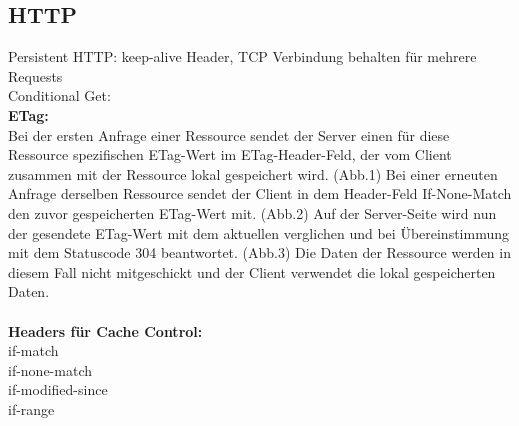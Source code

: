 \subsection{HTTP}
Persistent HTTP: keep-alive Header, TCP Verbindung behalten für mehrere Requests\\
Conditional Get: \\
\textbf{ETag:} \\Bei der ersten Anfrage einer Ressource sendet der Server einen für diese Ressource spezifischen ETag-Wert im ETag-Header-Feld, der vom Client zusammen mit der Ressource lokal gespeichert wird. (Abb.1) Bei einer erneuten Anfrage derselben Ressource sendet der Client in dem Header-Feld If-None-Match den zuvor gespeicherten ETag-Wert mit. (Abb.2) Auf der Server-Seite wird nun der gesendete ETag-Wert mit dem aktuellen verglichen und bei Übereinstimmung mit dem Statuscode 304 beantwortet. (Abb.3) Die Daten der Ressource werden in diesem Fall nicht mitgeschickt und der Client verwendet die lokal gespeicherten Daten.\\\\
\textbf{Headers für Cache Control:}\\
if-match\\
if-none-match\\
if-modified-since\\
if-range\\\\

